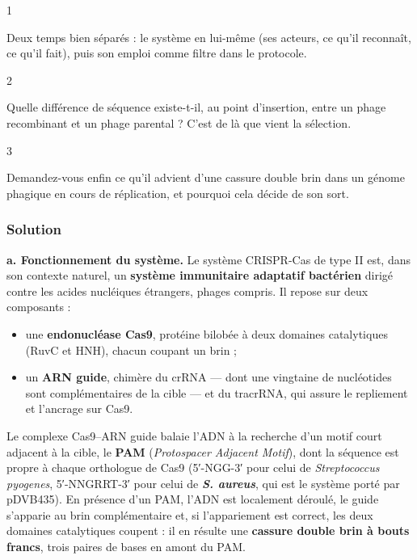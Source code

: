 \documentclass[11pt,a4paper]{article}
\providecommand{\tightlist}{\setlength{\itemsep}{0pt}\setlength{\parskip}{0pt}}
\begin{document}
\begin{indication}{1}

Deux temps bien séparés : le système en lui-même (ses acteurs, ce qu'il reconnaît, ce qu'il fait), puis son emploi comme filtre dans le protocole.

\end{indication}

\begin{indication}{2}

Quelle différence de séquence existe-t-il, au point d'insertion, entre un phage recombinant et un phage parental ? C'est de là que vient la sélection.

\end{indication}

\begin{indication}{3}

Demandez-vous enfin ce qu'il advient d'une cassure double brin dans un génome phagique en cours de réplication, et pourquoi cela décide de son sort.

\end{indication}

\hypertarget{solution-5}{%
\subsubsection{Solution}\label{solution-5}}

\textbf{a. Fonctionnement du système.} Le système CRISPR-Cas de type II est, dans son contexte naturel, un \textbf{système immunitaire adaptatif bactérien} dirigé contre les acides nucléiques étrangers, phages compris. Il repose sur deux composants :

\begin{itemize}
\tightlist
\item
  une \textbf{endonucléase Cas9}, protéine bilobée à deux domaines catalytiques (RuvC et HNH), chacun coupant un brin ;
\item
  un \textbf{ARN guide}, chimère du crRNA --- dont une vingtaine de nucléotides sont complémentaires de la cible --- et du tracrRNA, qui assure le repliement et l'ancrage sur Cas9.
\end{itemize}

Le complexe Cas9--ARN guide balaie l'ADN à la recherche d'un motif court adjacent à la cible, le \textbf{PAM} (\emph{Protospacer Adjacent Motif}), dont la séquence est propre à chaque orthologue de Cas9 (5′-NGG-3′ pour celui de \emph{Streptococcus pyogenes}, 5′-NNGRRT-3′ pour celui de \textbf{\emph{S. aureus}}, qui est le système porté par pDVB435). En présence d'un PAM, l'ADN est localement déroulé, le guide s'apparie au brin complémentaire et, si l'appariement est correct, les deux domaines catalytiques coupent : il en résulte une \textbf{cassure double brin à bouts francs}, trois paires de bases en amont du PAM.
\end{document}
